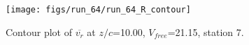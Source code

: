 \begin{figure}[H]
\centering
\texttt{[image: figs/run\_64/run\_64\_R\_contour]}
\caption{Contour plot of $\overline{v_{r}}$ at $z/c$=10.00, $V_{free}$=21.15, station 7.}
\label{fig:run_64_R_contour}
\end{figure}


